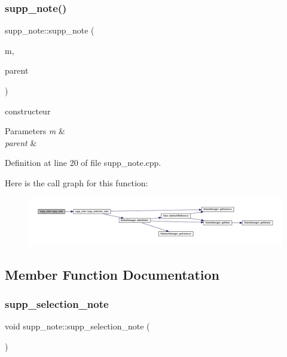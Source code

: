 \subsubsection{\texorpdfstring{supp\+\_\+note()}{supp\_note()}}
{\footnotesize\ttfamily supp\+\_\+note\+::supp\+\_\+note (\begin{DoxyParamCaption}\item[{Q\+Standard\+Item\+Model $\ast$}]{m,  }\item[{Q\+Widget $\ast$}]{parent }\end{DoxyParamCaption})}



constructeur 


\begin{DoxyParams}{Parameters}
{\em m} & \\
\hline
{\em parent} & \\
\hline
\end{DoxyParams}


Definition at line 20 of file supp\+\_\+note.\+cpp.

Here is the call graph for this function\+:\nopagebreak
\begin{figure}[H]
\begin{center}
\leavevmode
\includegraphics[width=350pt]{classsupp__note_a0a8f0c351866f8026cabfd981b919889_cgraph}
\end{center}
\end{figure}


\subsection{Member Function Documentation}
\mbox{\label{classsupp__note_a5dbf6d3af5c94d71f42eeb2cf626c9d3}} 
\subsubsection{\texorpdfstring{supp\+\_\+selection\+\_\+note}{supp\_selection\_note}}
{\footnotesize\ttfamily void supp\+\_\+note\+::supp\+\_\+selection\+\_\+note (\begin{DoxyParamCaption}{ }\end{DoxyParamCaption})\hspace{0.3cm}{\ttfamily [slot]}}



